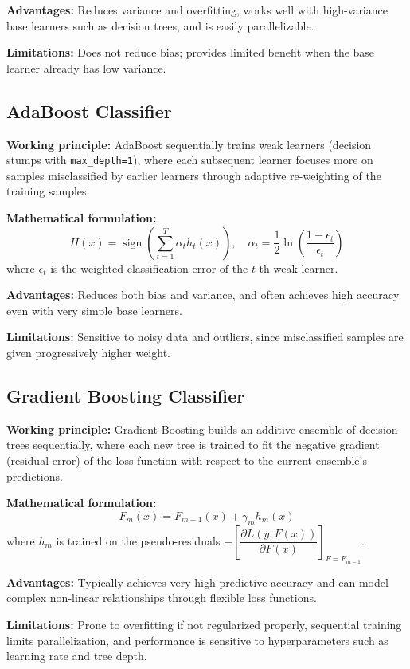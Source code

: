 \documentclass[12pt,a4paper]{article}
\begin{document}
\textbf{Advantages:} Reduces variance and overfitting, works well with high-variance base learners such as decision trees, and is easily parallelizable.

\textbf{Limitations:} Does not reduce bias; provides limited benefit when the base learner already has low variance.

\subsection*{AdaBoost Classifier}
\textbf{Working principle:} AdaBoost sequentially trains weak learners (decision stumps with \texttt{max\_depth=1}), where each subsequent learner focuses more on samples misclassified by earlier learners through adaptive re-weighting of the training samples.

\textbf{Mathematical formulation:}
\[
H(x) = \operatorname{sign}\left(\sum_{t=1}^{T}\alpha_t h_t(x)\right), \quad \alpha_t = \frac{1}{2}\ln\left(\frac{1-\epsilon_t}{\epsilon_t}\right)
\]
where $\epsilon_t$ is the weighted classification error of the $t$-th weak learner.

\textbf{Advantages:} Reduces both bias and variance, and often achieves high accuracy even with very simple base learners.

\textbf{Limitations:} Sensitive to noisy data and outliers, since misclassified samples are given progressively higher weight.

\subsection*{Gradient Boosting Classifier}
\textbf{Working principle:} Gradient Boosting builds an additive ensemble of decision trees sequentially, where each new tree is trained to fit the negative gradient (residual error) of the loss function with respect to the current ensemble's predictions.

\textbf{Mathematical formulation:}
\[
F_m(x) = F_{m-1}(x) + \gamma_m h_m(x)
\]
where $h_m$ is trained on the pseudo-residuals $-\left[\dfrac{\partial L(y,F(x))}{\partial F(x)}\right]_{F=F_{m-1}}$.

\textbf{Advantages:} Typically achieves very high predictive accuracy and can model complex non-linear relationships through flexible loss functions.

\textbf{Limitations:} Prone to overfitting if not regularized properly, sequential training limits parallelization, and performance is sensitive to hyperparameters such as learning rate and tree depth.
\end{document}
